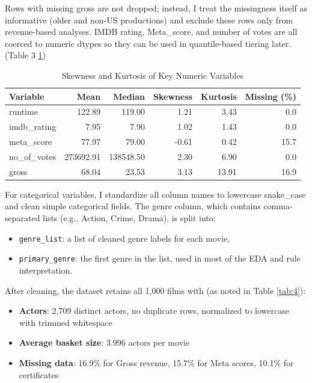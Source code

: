 \documentclass{article}  %
\begin{document}
Rows with missing gross are not dropped; instead, I treat the missingness itself as informative (older and non-US productions) and exclude these rows only from revenue-based analyses. IMDB rating, Meta\_score, and number of votes are all coerced to numeric dtypes so they can be used in quantile-based tiering later. (Table 3 \ref{tab:3})
\begin{table}[!htbp]
    \caption{Skewness and Kurtosis of Key Numeric Variables}
    \centering
    \begin{tabular}{lrrrrr}
        \toprule
        \textbf{Variable} & \textbf{Mean} & \textbf{Median} & \textbf{Skewness} & \textbf{Kurtosis} & \textbf{Missing (\%)}\\
        \midrule
        runtime      & 122.89   & 119.00   & 1.21  & 3.43  & 0.0  \\
        imdb\_rating & 7.95     & 7.90     & 1.02  & 1.43  & 0.0  \\
        meta\_score & 77.97    & 79.00    & -0.61 & 0.42  & 15.7 \\
        no\_of\_votes & 273692.91 & 138548.50 & 2.30 & 6.90 & 0.0  \\
        gross        & 68.04    & 23.53    & 3.13  & 13.91 & 16.9 \\
        \bottomrule
    \end{tabular}
    \label{tab:3}
\end{table}

For categorical variables, I standardize all column names to lowercase snake\_case and clean simple categorical fields. The genre column, which contains comma-separated lists (e.g., Action, Crime, Drama), is split into:

\begin{itemize}
    \item \verb|genre_list|: a list of cleaned genre labels for each movie,
    \item \verb|primary_genre|: the first genre in the list, used in most of the EDA and rule interpretation.
\end{itemize}

After cleaning, the dataset retains all 1,000 films with (as noted in Table \ref{tab:4}):
\begin{itemize}
    \item \textbf{Actors}: 2,709 distinct actors, no duplicate rows, normalized to lowercase with trimmed whitespace
    \item \textbf{Average basket size}: 3.996 actors per movie
    \item \textbf{Missing data}: 16.9\% for Gross revenue, 15.7\% for Meta scores, 10.1\% for certificates
\end{itemize}
\end{document}
